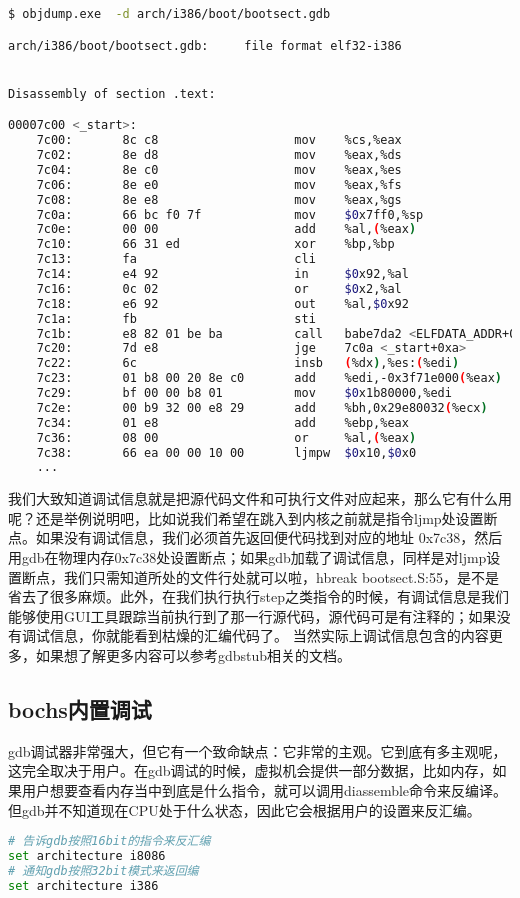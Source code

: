 \begin{lstlisting}[language=bash]
$ objdump.exe  -d arch/i386/boot/bootsect.gdb

arch/i386/boot/bootsect.gdb:     file format elf32-i386


Disassembly of section .text:

00007c00 <_start>:
    7c00:       8c c8                   mov    %cs,%eax
    7c02:       8e d8                   mov    %eax,%ds
    7c04:       8e c0                   mov    %eax,%es
    7c06:       8e e0                   mov    %eax,%fs
    7c08:       8e e8                   mov    %eax,%gs
    7c0a:       66 bc f0 7f             mov    $0x7ff0,%sp
    7c0e:       00 00                   add    %al,(%eax)
    7c10:       66 31 ed                xor    %bp,%bp
    7c13:       fa                      cli
    7c14:       e4 92                   in     $0x92,%al
    7c16:       0c 02                   or     $0x2,%al
    7c18:       e6 92                   out    %al,$0x92
    7c1a:       fb                      sti
    7c1b:       e8 82 01 be ba          call   babe7da2 <ELFDATA_ADDR+0xbabc7da2>
    7c20:       7d e8                   jge    7c0a <_start+0xa>
    7c22:       6c                      insb   (%dx),%es:(%edi)
    7c23:       01 b8 00 20 8e c0       add    %edi,-0x3f71e000(%eax)
    7c29:       bf 00 00 b8 01          mov    $0x1b80000,%edi
    7c2e:       00 b9 32 00 e8 29       add    %bh,0x29e80032(%ecx)
    7c34:       01 e8                   add    %ebp,%eax
    7c36:       08 00                   or     %al,(%eax)
    7c38:       66 ea 00 00 10 00       ljmpw  $0x10,$0x0
    ...
\end{lstlisting}
我们大致知道调试信息就是把源代码文件和可执行文件对应起来，那么它有什么用呢？还是举例说明吧，比如说我们希望在跳入到内核之前就是指令ljmp处设置断点。如果没有调试信息，我们必须首先返回便代码找到对应的地址 0x7c38，然后用gdb在物理内存0x7c38处设置断点；如果gdb加载了调试信息，同样是对ljmp设置断点，我们只需知道所处的文件行处就可以啦，hbreak bootsect.S:55，是不是省去了很多麻烦。此外，在我们执行执行step之类指令的时候，有调试信息是我们能够使用GUI工具跟踪当前执行到了那一行源代码，源代码可是有注释的；如果没有调试信息，你就能看到枯燥的汇编代码了。
当然实际上调试信息包含的内容更多，如果想了解更多内容可以参考gdbstub相关的文档。

\subsection{bochs内置调试}
gdb调试器非常强大，但它有一个致命缺点：它非常的主观。它到底有多主观呢，这完全取决于用户。在gdb调试的时候，虚拟机会提供一部分数据，比如内存，如果用户想要查看内存当中到底是什么指令，就可以调用diassemble命令来反编译。但gdb并不知道现在CPU处于什么状态，因此它会根据用户的设置来反汇编。
\begin{lstlisting}[language=bash]
# 告诉gdb按照16bit的指令来反汇编
set architecture i8086
# 通知gdb按照32bit模式来返回编
set architecture i386
\end{lstlisting}

